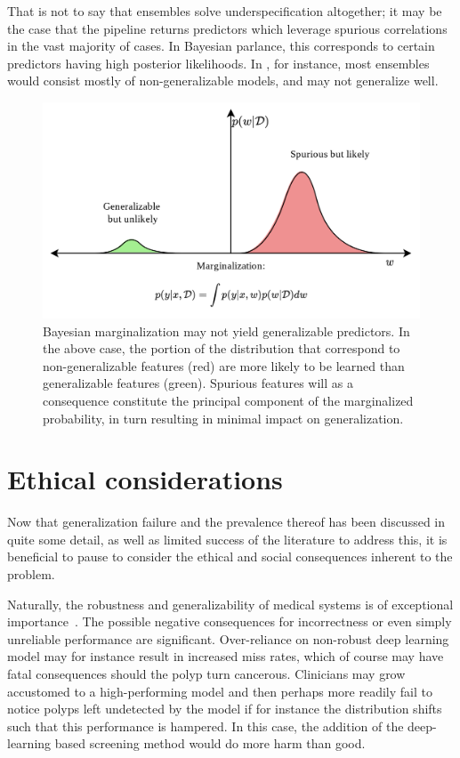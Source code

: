 That is not to say that ensembles solve underspecification altogether; it may be the case that the pipeline returns predictors which leverage spurious correlations in the vast majority of cases. In Bayesian parlance, this corresponds to certain predictors having high posterior likelihoods. In , for instance, most ensembles would consist mostly of non-generalizable models, and may not generalize well. 
\begin{figure}
    \centering
    \includegraphics[width=\linewidth]{illustrations/bayesian.png}
    \caption[Bayesian Marginalization and Generalization]{Bayesian marginalization may not yield generalizable predictors. In the above case, the portion of the distribution that correspond to non-generalizable features (red) are more likely to be learned than generalizable features (green). Spurious features will as a consequence constitute the principal component of the marginalized probability, in turn resulting in minimal impact on generalization.}
    \label{fig:bayesian_generalization}
\end{figure}

\section{Ethical considerations}\label{ethics}
    Now that generalization failure and the prevalence thereof has been discussed in quite some detail, as well as limited success of the literature to address this, it is beneficial to pause to consider the ethical and social consequences inherent to the problem. 
    
    Naturally, the robustness and generalizability of medical systems is of exceptional importance~\cite{ethics_1}. The possible negative consequences for incorrectness or even simply unreliable performance are significant. Over-reliance on non-robust deep learning model may for instance result in increased miss rates, which of course may have fatal consequences should the polyp turn cancerous. Clinicians may grow accustomed to a high-performing model and then perhaps more readily fail to notice polyps left undetected by the model if for instance the distribution shifts such that this performance is hampered. In this case, the addition of the deep-learning based screening method would do more harm than good.
    
